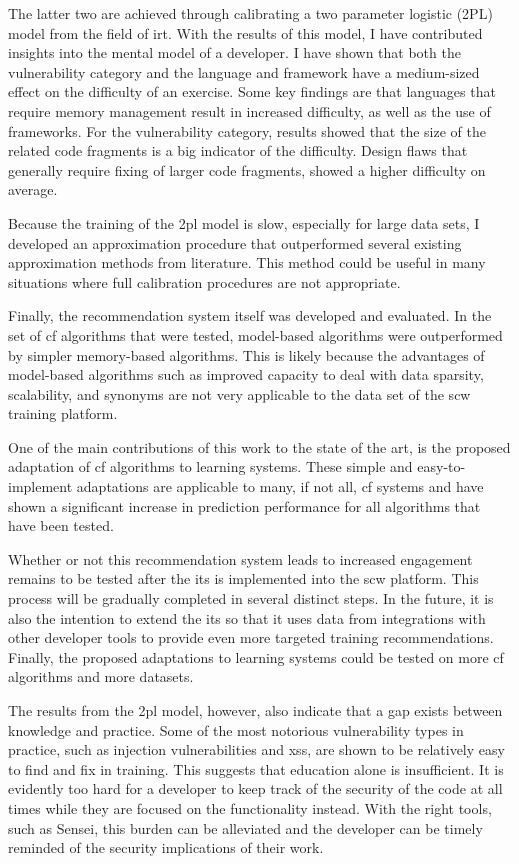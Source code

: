 The latter two are achieved through calibrating a two parameter logistic (2PL) model from the field of \gls{irt}.
With the results of this model, I have contributed insights into the mental model of a developer.
I have shown that both the vulnerability category and the language and framework have a medium-sized effect on the difficulty of an exercise.
Some key findings are that languages that require memory management result in increased difficulty, as well as the use of frameworks.
For the vulnerability category, results showed that the size of the related code fragments is a big indicator of the difficulty.
Design flaws that generally require fixing of larger code fragments, showed a higher difficulty on average.

Because the training of the \gls{2pl} model is slow, especially for large data sets, I developed an approximation procedure that outperformed several existing approximation methods from literature.
This method could be useful in many situations where full calibration procedures are not appropriate.

Finally, the recommendation system itself was developed and evaluated.
In the set of \gls{cf} algorithms that were tested, model-based algorithms were outperformed by simpler memory-based algorithms.
This is likely because the advantages of model-based algorithms such as improved capacity to deal with data sparsity, scalability, and synonyms are not very applicable to the data set of the \gls{scw} training platform.

One of the main contributions of this work to the state of the art, is the proposed adaptation of \gls{cf} algorithms to learning systems.
These simple and easy-to-implement adaptations are applicable to many, if not all, \gls{cf} systems and have shown a significant increase in prediction performance for all algorithms that have been tested.

Whether or not this recommendation system leads to increased engagement remains to be tested after the \gls{its} is implemented into the \gls{scw} platform.
This process will be gradually completed in several distinct steps.
In the future, it is also the intention to extend the \gls{its} so that it uses data from integrations with other developer tools to provide even more targeted training recommendations.
Finally, the proposed adaptations to learning systems could be tested on more \gls{cf} algorithms and more datasets. 

The results from the \gls{2pl} model, however, also indicate that a gap exists between knowledge and practice.
Some of the most notorious vulnerability types in practice, such as injection vulnerabilities and \gls{xss}, are shown to be relatively easy to find and fix in training.
This suggests that education alone is insufficient.
It is evidently too hard for a developer to keep track of the security of the code at all times while they are focused on the functionality instead.
With the right tools, such as Sensei, this burden can be alleviated and the developer can be timely reminded of the security implications of their work.

